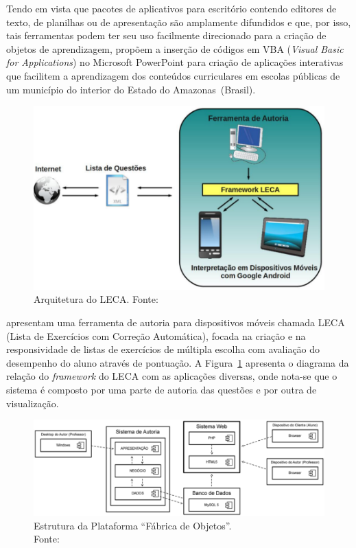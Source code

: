 Tendo em vista que pacotes de aplicativos para escritório contendo editores de texto, de planilhas ou de apresentação são amplamente difundidos e que, por isso, tais ferramentas podem ter seu uso facilmente direcionado para a criação de objetos de aprendizagem, \cite{Passos:2010} propõem a inserção de códigos em VBA (\textit{Visual Basic for Applications}) no Microsoft PowerPoint para criação de aplicações interativas que facilitem a aprendizagem dos conteúdos curriculares em escolas públicas de um município do interior do Estado do Amazonas~(Brasil).

\begin{figure}[htb]
	\centering
	\includegraphics[width=0.8\linewidth]{chapters/works/orlandi2012.png}
	\caption{Arquitetura do LECA. Fonte:~\cite{Orlandi:2012}}
	\label{fig:orlandi2012}
\end{figure}

\cite{Orlandi:2012} apresentam uma ferramenta de autoria para dispositivos móveis chamada LECA (Lista de Exercícios com Correção Automática), focada na criação e na responsividade de listas de exercícios de múltipla escolha com avaliação do desempenho do aluno através de pontuação. A Figura~\ref{fig:orlandi2012} apresenta o diagrama da relação do \textit{framework} do LECA com as aplicações diversas, onde nota-se que o sistema é composto por uma parte de autoria das questões e por outra de visualização.

\begin{figure}[htb]
	\centering
	\includegraphics[width=0.8\linewidth]{chapters/works/guterres2014.png}
	\captionsetup{justification=centering}
	\caption{Estrutura da Plataforma ``Fábrica de Objetos''. \\Fonte:~\cite{Guterres:2014}}
	\label{fig:guterres2014}
\end{figure}


